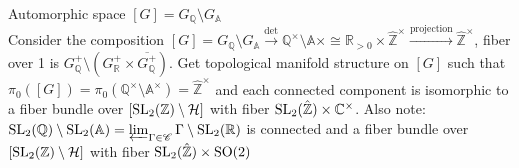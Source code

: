 \documentclass[main]{subfiles}
\begin{document}
Automorphic space $[G]=G_{\mathbb Q}\setminus G_{\mathbb A}$ \\
Consider the composition $[G]=G_{\mathbb Q}\setminus G_{\mathbb A}\xrightarrow{\det}\mathbb Q^\times\setminus\mathbb A\times\cong\mathbb R_{>0}\times\hat{\mathbb Z}^\times\xrightarrow{\mathrm{projection}}\hat{\mathbb Z}^\times$, fiber over 1 is $G^+_{\mathbb Q}\setminus(G^+_{\mathbb R}\times\overline{G^+_{\mathbb Q}})$. Get topological manifold structure on $[G]$ such that $\pi_0([G])=\pi_0(\mathbb Q^\times\setminus\mathbb A^\times)=\hat{\mathbb Z}^\times$ and each connected component is isomorphic to a fiber bundle over $[\operatorname{SL}_2(\mathbb Z)\setminus\mathcal H]$ with fiber $\operatorname{SL}_2(\hat{\mathbb Z})\times\mathbb C^\times$. Also note: $\operatorname{SL}_2(\mathbb Q)\setminus\operatorname{SL}_2(\mathbb A)=\varprojlim_{\Gamma\in\mathscr C}\Gamma\setminus\operatorname{SL}_2(\mathbb R)$ is connected and a fiber bundle over $[\operatorname{SL}_2(\mathbb Z)\setminus\mathcal H]$ with fiber $\operatorname{SL}_2(\hat{\mathbb Z})\times\operatorname{SO}(2)$
\end{document}
